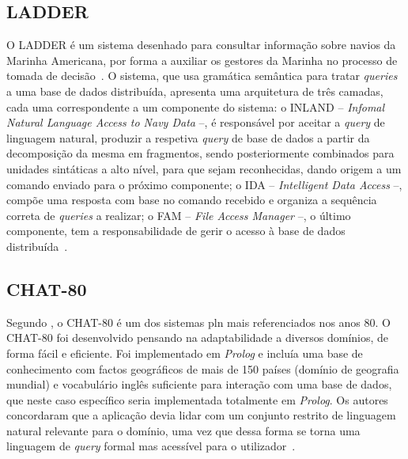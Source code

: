 \subsection*{LADDER}
O LADDER é um sistema desenhado para consultar informação sobre navios da Marinha Americana, por forma a auxiliar os gestores da Marinha no processo de tomada de decisão~\parencite{nlidb_brief_review, developing_nli_complex_data}. O sistema, que usa gramática semântica para tratar \textit{queries} a uma base de dados distribuída, apresenta uma arquitetura de três camadas, cada uma correspondente a um componente do sistema: o INLAND -- \textit{Infomal Natural Language Access to Navy Data} --, é responsável por aceitar a \textit{query} de linguagem natural, produzir a respetiva \textit{query} de base de dados a partir da decomposição da mesma em fragmentos, sendo posteriormente combinados para unidades sintáticas a alto nível, para que sejam reconhecidas, dando origem a um comando enviado para o próximo componente; o IDA -- \textit{Intelligent Data Access} --, compõe uma resposta com base no comando recebido e organiza a sequência correta de \textit{queries} a realizar; o FAM -- \textit{File Access Manager} --, o último componente, tem a responsabilidade de gerir o acesso à base de dados distribuída~\parencite{developing_nli_complex_data}.

\subsection{CHAT-80}
Segundo \textcite{nlidb_brief_review}, o CHAT-80 é um dos sistemas \gls{pln} mais referenciados nos anos 80. O CHAT-80 foi desenvolvido pensando na adaptabilidade a diversos domínios, de forma fácil e eficiente. Foi implementado em \textit{Prolog} e incluía uma base de conhecimento com factos geográficos de mais de 150 países (domínio de geografia mundial) e vocabulário inglês suficiente para interação com uma base de dados, que neste caso específico seria implementada totalmente em \textit{Prolog}. Os autores concordaram que a aplicação devia lidar com um conjunto restrito de linguagem natural relevante para o domínio, uma vez que dessa forma se torna uma linguagem de \textit{query} formal mas acessível para o utilizador~\parencite{efficient_easily_adaptable_system_interpreting_nlq}.

